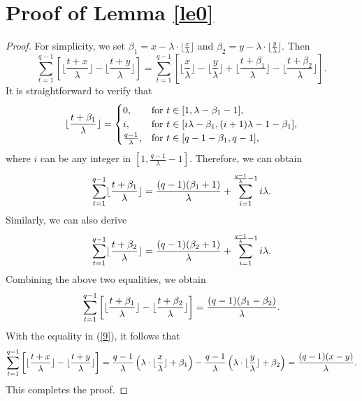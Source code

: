 \documentclass[journal,onecolumn]{IEEEtran}
\begin{document}
\section{Proof of Lemma \ref{le0}}
\begin{proof}
For simplicity, we set  $\beta_1= x - \lambda\cdot \lfloor \frac{x}{\lambda} \rfloor $ and $\beta_2= y - \lambda\cdot \lfloor \frac{y}{\lambda} \rfloor $.  Then   
 \begin{equation}\label{9}
  \sum\limits_{t=1}^{q-1} \left [\lfloor \frac{t+x}{\lambda}\rfloor- \lfloor \frac{t+y}{\lambda}\rfloor \right]= \sum\limits_{t=1}^{q-1} \left[\lfloor \frac{x}{\lambda} \rfloor -\lfloor \frac{y}{\lambda}\rfloor+ 
 \lfloor  \frac{t+\beta_1}{\lambda}\rfloor-\lfloor \frac{t+\beta_2}{\lambda}\rfloor\right].
\end{equation}  
  It is straightforward to verify that  
\begin{equation}\notag
\lfloor\frac{t+\beta_1}{\lambda}\rfloor =\begin{cases}
    0, &\hbox{for } t\in [1, \lambda-\beta_1-1],    \\ 
    i,&\hbox{for }  t\in [i\lambda-\beta_1,(i+1)\lambda-1-\beta_1],\\
    \frac{q-1}{\lambda},&\hbox{for } t\in [q-1-\beta_1,q-1],
\end{cases}    
\end{equation}
where $i$ can be any integer in  $[1,\frac{q-1}{\lambda}-1].$
Therefore, we can obtain  
\begin{equation}\notag
    \sum\limits_{t=1}^{q-1}\lfloor \frac{t+\beta_1}{\lambda}\rfloor=\frac{(q-1)(\beta_1+1)}{\lambda}+\sum\limits_{i=1}^{\frac{q-1}{\lambda}-1}i\lambda.
\end{equation}
Similarly, we can also derive
   \begin{equation}\notag
    \sum\limits_{t=1}^{q-1}\lfloor \frac{t+\beta_2}{\lambda}\rfloor=\frac{(q-1)(\beta_2+1)}{\lambda}+\sum\limits_{i=1}^{\frac{q-1}{\lambda}-1}i\lambda.
\end{equation}
Combining the above two equalities, we obtain 
\begin{equation}\notag
    \sum\limits_{t=1}^{q-1} \left[\lfloor \frac{t+\beta_1}{\lambda}\rfloor-\lfloor \frac{t+\beta_2}{\lambda}\rfloor\right]=\frac{(q-1)(\beta_1-\beta_2)}{\lambda}.
\end{equation}
With the equality in (\ref{9}), it follows that 
\begin{equation}\notag
      \sum\limits_{t=1}^{q-1}\left[\lfloor \frac{t+x}{\lambda}\rfloor- \lfloor \frac{t+y}{\lambda}\rfloor \right] = \frac{q-1}{\lambda}\left(\lambda \cdot  \lfloor \frac{x}{\lambda} \rfloor +\beta_1\right)- \frac{q-1}{\lambda}\left(\lambda \cdot  \lfloor \frac{y}{\lambda} \rfloor +\beta_2\right)=\frac{(q-1)(x-y)}{\lambda}.
    \end{equation}This completes the proof.
\end{proof}
\end{document}
